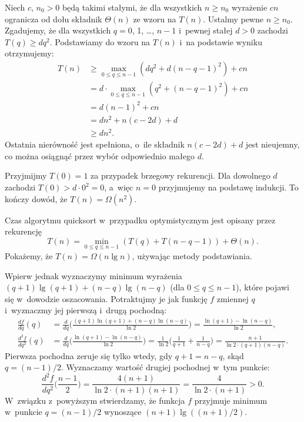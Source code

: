 
\exercise %
Niech $c$, $n_0>0$ będą takimi stałymi, że dla wszystkich $n\ge n_0$ wyrażenie $cn$ ogranicza od dołu składnik $\Theta(n)$ ze wzoru na $T(n)$.
Ustalmy pewne $n\ge n_0$.
Zgadujemy, że dla wszystkich $q=0$, 1, \dots, $n-1$ i~pewnej stałej $d>0$ zachodzi $T(q)\ge dq^2$.
Podstawiamy do wzoru na $T(n)$ i~na podstawie wyniku  otrzymujemy:
\begin{align*}
	T(n) &\ge \max_{0\le q\le n-1}(dq^2+d(n-q-1)^2)+cn \\
	&= d\cdot\!\!\!\max_{0\le q\le n-1}(q^2+(n-q-1)^2)+cn \\
	&= d(n-1)^2+cn \\
	&= dn^2+n(c-2d)+d \\
	&\ge dn^2.
\end{align*}
Ostatnia nierówność jest spełniona, o~ile składnik $n(c-2d)+d$ jest nieujemny, co można osiągnąć przez wybór odpowiednio małego $d$.

Przyjmijmy $T(0)=1$ za przypadek brzegowy rekurencji.
Dla dowolnego $d$ zachodzi $T(0)>d\cdot0^2=0$, a~więc $n=0$ przyjmujemy na podstawę indukcji.
To kończy dowód, że $T(n)=\Omega(n^2)$.

\exercise %
Czas algorytmu quicksort w~przypadku optymistycznym jest opisany przez rekurencję
\[
    T(n) = \min_{0\le q\le n-1}(T(q)+T(n-q-1))+\Theta(n).
\]
Pokażemy, że $T(n)=\Omega(n\lg n)$, używając metody podstawiania.

Wpierw jednak wyznaczymy minimum wyrażenia $(q+1)\lg(q+1)+(n-q)\lg(n-q)$ (dla $0\le q\le n-1$), które pojawi się w~dowodzie oszacowania.
Potraktujmy je jak funkcję $f$ zmiennej $q$ i~wyznaczmy jej pierwszą i~drugą pochodną:
\begin{align*}
    \frac{df}{dq}(q) &= \frac{d}{dq}\biggl(\frac{(q+1)\ln(q+1)+(n-q)\ln(n-q)}{\ln2}\biggr) = \frac{\ln(q+1)-\ln(n-q)}{\ln2}, \\[1mm]
	\frac{d^2\!f}{dq^2}(q) &= \frac{d}{dq}\biggl(\frac{\ln(q+1)-\ln(n-q)}{\ln2}\biggr) = \frac{1}{\ln2}\biggl(\frac{1}{q+1}+\frac{1}{n-q}\biggr) = \frac{n+1}{\ln2\cdot(q+1)(n-q)}.
\end{align*}
Pierwsza pochodna zeruje się tylko wtedy, gdy $q+1=n-q$, skąd $q=(n-1)/2$.
Wyznaczamy wartość drugiej pochodnej w~tym punkcie:
\[
    \frac{d^2\!f}{dq^2}\biggl(\frac{n-1}{2}\biggr) = \frac{4(n+1)}{\ln2\cdot(n+1)(n+1)} = \frac{4}{\ln2\cdot(n+1)} > 0.
\]
W~związku z~powyższym stwierdzamy, że funkcja $f$ przyjmuje minimum w~punkcie $q=(n-1)/2$ wynoszące $(n+1)\lg((n+1)/2)$.

